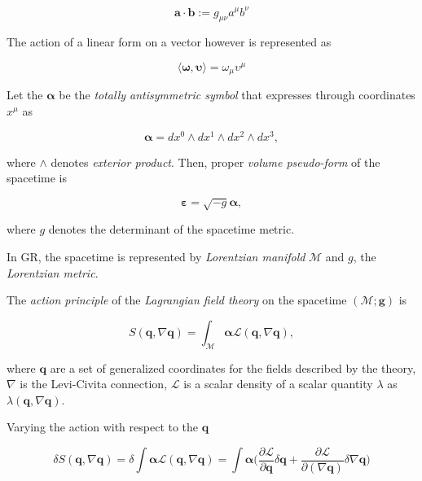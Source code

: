 \begin{equation}
\boldsymbol{a}\cdot\boldsymbol{b}:=g_{\mu\nu}a^{\mu}b^{\nu}
\end{equation}

The action of a linear form on a vector however is represented as 

\begin{equation}
\langle\boldsymbol{\omega},\boldsymbol{\upsilon}\rangle=\omega_{\mu}\upsilon^{\mu}
\end{equation}

Let the $\boldsymbol{\alpha}$ be the \textit{totally antisymmetric symbol} that expresses through coordinates $x^{\mu}$ as

\begin{equation}
\boldsymbol{\alpha} = dx^0 \wedge dx^1 \wedge dx^2 \wedge dx^3,
\end{equation}

where $\wedge$ denotes \textit{exterior product}. 
Then, proper \textit{volume pseudo-form} of the spacetime is

\begin{equation}
\boldsymbol{\varepsilon} = \sqrt{-g}\boldsymbol{\alpha},
\end{equation}

where $g$ denotes the determinant of the spacetime metric.

In GR, the spacetime is represented by \textit{Lorentzian manifold} $\mathcal{M}$ and $g$, the \textit{Lorentzian metric}.

The \textit{action principle} of the \textit{Lagrangian field theory} on the spacetime $(\mathcal{M}; \boldsymbol{g})$ is

\begin{equation}
S(\boldsymbol{q}, \nabla\boldsymbol{q}) = \int_{\mathcal{M}}\boldsymbol{\alpha}\mathcal{L}(\boldsymbol{q}, \nabla\boldsymbol{q}),
\end{equation}

where $\boldsymbol{q}$ are a set of generalized coordinates for the fields described by the theory, $\nabla$ is the Levi-Civita connection, $\mathcal{L}$ is a scalar density of a scalar quantity $\lambda$ as $\lambda(\boldsymbol{q},\nabla\boldsymbol{q})$. 

Varying the action with respect to the $\boldsymbol{q}$

\begin{equation}
\delta S(\boldsymbol{q}, \nabla\boldsymbol{q}) = \delta\int\boldsymbol{\alpha}\mathcal{L}(\boldsymbol{q}, \nabla\boldsymbol{q}) = \int\boldsymbol{\alpha}\Big(\frac{\partial\mathcal{L}}{\partial\boldsymbol{q}}\delta\boldsymbol{q}+\frac{\partial\mathcal{L}}{\partial(\nabla\boldsymbol{q})}\delta\nabla\boldsymbol{q}\Big)
\end{equation}

